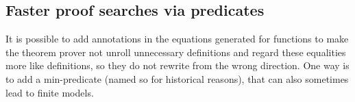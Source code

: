 \subsection{Faster proof searches via predicates}

It is possible to add annotations in the equations generated for
functions to make the theorem prover not unroll unnecessary
definitions and regard these equalities more like definitions, so they
do not rewrite from the wrong direction. One way is to add a
min-predicate (named so for historical reasons), that can also
sometimes lead to finite models.

